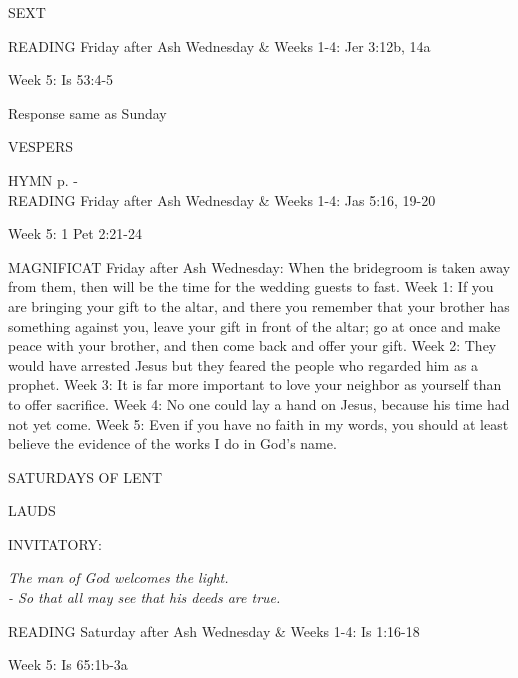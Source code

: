 \begin{flushleft}\normalsize{\uppercase{SEXT\\}}\end{flushleft}
READING
Friday after Ash Wednesday \& Weeks 1-4:    Jer 3:12b, 14a    

Week 5:    Is 53:4-5    

Response same as Sunday

\begin{flushleft}\normalsize{\uppercase{VESPERS\\}}\end{flushleft}
\small{\uppercase{HYMN} p. \pageref{lent:firstHymn}-\pageref{lent:lastHymn}\\}
READING
Friday after Ash Wednesday \& Weeks 1-4:    Jas 5:16, 19-20    

Week 5:    1 Pet 2:21-24    

MAGNIFICAT
Friday after Ash Wednesday:	When the bridegroom is taken away from them, then will be the time for the wedding guests to fast.
Week 1:	If you are bringing your gift to the altar, and there you remember that your brother has something against you, leave your gift in front of the altar; go at once and make peace with your brother, and then come back and offer your gift.
Week 2:	They would have arrested Jesus but they feared the people who regarded him as a prophet.
Week 3:	It is far more important to love your neighbor as yourself than to offer sacrifice.
Week 4:	No one could lay a hand on Jesus, because his time had not yet come.
Week 5:	Even if you have no faith in my words, you should at least believe the evidence of the works I do in God's name.

	\begin{center}
\normalsize SATURDAYS OF LENT
	\end{center}

\begin{flushleft}\normalsize{\uppercase{LAUDS\\}}\end{flushleft}
\small{\uppercase{INVITATORY:}}\normalsize
\begin{center}
\textit{The man of God welcomes the light.\\}
\textit{- So that all may see that his deeds are true.\\}
\end{center}
READING
Saturday after Ash Wednesday \& Weeks 1-4:    Is 1:16-18    

Week 5:    Is 65:1b-3a    

